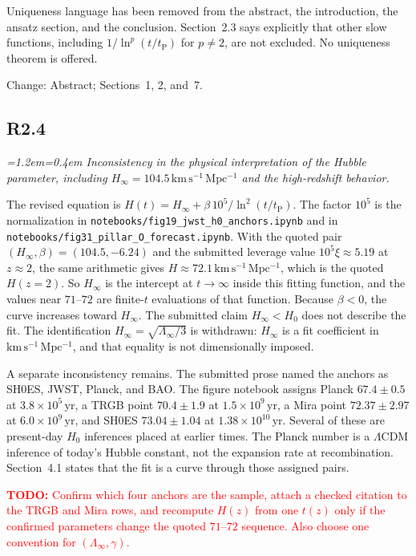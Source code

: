 \documentclass[11pt,a4paper]{article}
\newenvironment{review}{\par\color{revcolor}\itshape\leftskip=1.2em\rightskip=0.4em\noindent}{\par\leftskip=0pt\rightskip=0pt}
\newcommand{\revtodo}[1]{\textcolor{red}{\textbf{TODO:} #1}}
\begin{document}
Uniqueness language has been removed from the abstract, the introduction, the ansatz section, and the conclusion.
Section~2.3 says explicitly that other slow functions, including $1/\ln^p(t/t_{\mathrm{P}})$ for $p\neq 2$, are not excluded.
No uniqueness theorem is offered.

Change: Abstract; Sections~1, 2, and~7.

\subsection*{R2.4}
\begin{review}
Inconsistency in the physical interpretation of the Hubble parameter, including $H_\infty = 104.5\,\mathrm{km\,s^{-1}\,Mpc^{-1}}$ and the high-redshift behavior.
\end{review}

The revised equation is $H(t) = H_\infty + \beta\,10^{5}/\ln^2(t/t_{\mathrm{P}})$.
The factor $10^{5}$ is the normalization in \texttt{notebooks/fig19\_jwst\_h0\_anchors.ipynb} and in \texttt{notebooks/fig31\_pillar\_O\_forecast.ipynb}.
With the quoted pair $(H_\infty,\beta) = (104.5,-6.24)$ and the submitted leverage value $10^{5}\xi\approx 5.19$ at $z\approx 2$, the same arithmetic gives $H\approx 72.1\,\mathrm{km\,s^{-1}\,Mpc^{-1}}$, which is the quoted $H(z=2)$.
So $H_\infty$ is the intercept at $t\to\infty$ inside this fitting function, and the values near $71$--$72$ are finite-$t$ evaluations of that function.
Because $\beta<0$, the curve increases toward $H_\infty$.
The submitted claim $H_\infty < H_0$ does not describe the fit.
The identification $H_\infty = \sqrt{\Lambda_\infty/3}$ is withdrawn: $H_\infty$ is a fit coefficient in $\mathrm{km\,s^{-1}\,Mpc^{-1}}$, and that equality is not dimensionally imposed.

A separate inconsistency remains.
The submitted prose named the anchors as SH0ES, JWST, Planck, and BAO.
The figure notebook assigns Planck $67.4\pm 0.5$ at $3.8\times 10^{5}\,\mathrm{yr}$, a TRGB point $70.4\pm 1.9$ at $1.5\times 10^{9}\,\mathrm{yr}$, a Mira point $72.37\pm 2.97$ at $6.0\times 10^{9}\,\mathrm{yr}$, and SH0ES $73.04\pm 1.04$ at $1.38\times 10^{10}\,\mathrm{yr}$.
Several of these are present-day $H_0$ inferences placed at earlier times.
The Planck number is a $\Lambda$CDM inference of today's Hubble constant, not the expansion rate at recombination.
Section~4.1 states that the fit is a curve through those assigned pairs.

\revtodo{Confirm which four anchors are the sample, attach a checked citation to the TRGB and Mira rows, and recompute $H(z)$ from one $t(z)$ only if the confirmed parameters change the quoted $71$--$72$ sequence. Also choose one convention for $(\Lambda_\infty,\gamma)$.}
\end{document}

